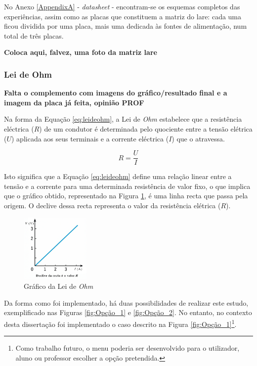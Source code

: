 No Anexo \ref{AppendixA} - \textit{datasheet} - encontram-se os esquemas completos das experiências, assim como as placas que constituem a matriz do \acrshort{lare}: cada uma ficou dividida por uma placa, mais uma dedicada às fontes de alimentação, num total de três placas. 

\textbf{Coloca aqui, falvez, uma foto da matriz lare}

\subsubsection{Lei de Ohm}
\label{sec:lei_ohm}
\textbf{Falta o complemento com imagens do gráfico/resultado final e a imagem da placa já feita, opinião PROF}

Na forma da Equação \ref{eq:leideohm}, a Lei de \textit{Ohm} estabelece que a resistência eléctrica ($R$) de um condutor é determinada pelo quociente entre a tensão elétrica ($U$) aplicada aos seus terminais e a corrente eléctrica ($I$) que o atravessa.  

\begin{equation} \label{eq:leideohm}
	R=\dfrac{U}{I}
\end{equation}

Isto significa que a Equação \ref{eq:leideohm} define uma relação linear entre a tensão e a corrente para uma determinada resistência de valor fixo, o que implica que o gráfico obtido, representado na Figura \ref{fig:graphohm}, é uma linha recta que passa pela origem. O declive dessa recta representa o valor da resistência elétrica ($R$).

\begin{figure}[hbtp]
	\centering
	\includegraphics[width=0.3\textwidth]{figures/grafico_Ohm.png}
	\caption{Gráfico da Lei de \textit{Ohm}}
	\label{fig:graphohm}
\end{figure}

Da forma como foi implementado, há duas possibilidades de realizar este estudo, exemplificado nas Figuras \ref{fig:Opção_1} e \ref{fig:Opção_2}. No entanto, no contexto desta dissertação foi  implementado o caso descrito na Figura \ref{fig:Opção_1}\footnote{Como trabalho futuro, o menu poderia ser desenvolvido para o utilizador, aluno ou professor escolher a opção pretendida.}. 

